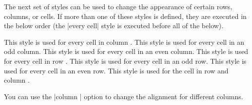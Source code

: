 \begin{codeexample}[]
\end{codeexample}

The next set of styles can be used to change the appearance of certain
rows, columns, or cells. If more than one of these styles is defined,
they are executed in the below order (the |every cell| style is
executed before all of the below).
\begin{itemize}
  This style is used for every cell in column .
  This style is used for every cell in an odd column.
  This style is used for every cell in an even column.
  This style is used for every cell in row .
  This style is used for every cell in an odd row.
  This style is used for every cell in an even row.
  This style is used for the cell in row  and column
  .
\end{itemize}


\begin{codeexample}[]
\end{codeexample}

You can use the |column | option to change the alignment
for different columns.

\begin{codeexample}[]
\end{codeexample}


